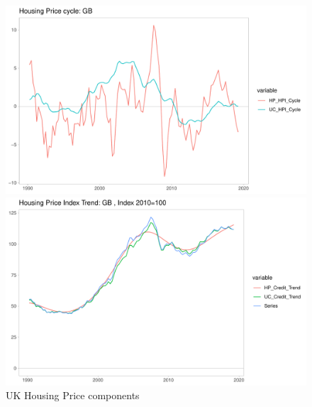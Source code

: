 \documentclass[fleqn]{article}
\begin{document}
\begin{outline}[enumerate]
\begin{figure}[h!]
	\caption{UK Housing Price components}	
	\centerline{\includegraphics[scale=0.7]{../../VAR_2_notrendcovar/Output/Graphs/HP_cycle_GB.pdf}}
	\centerline{\includegraphics[scale=0.7]{../../VAR_2_notrendcovar/Output/Graphs/HP_trend_GB.pdf}}
\end{figure}



\end{outline}
\end{document}
